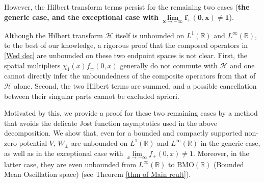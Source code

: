 \documentclass[reqno]{amsart}
\newcommand\R{\mathbb{R}}
\newcommand\HH{\mathcal{H}}
\numberwithin{equation}{section}
\begin{document}
However, the Hilbert transform terms persist for the remaining two cases ({\bf the generic case, and the exceptional case with} $\bm{\lim\limits_{x\rightarrow-\infty}f_+(0,x)\neq1}$).

Although the Hilbert transform $\HH$ itself is unbounded on $L^1(\R)$ and $L^{\infty}(\R)$, to the best of our knowledge, a rigorous proof that the composed operators in \eqref{Wed dec}
are unbounded on these two endpoint spaces is not clear. 
First, the spatial multipliers $\chi_{1}(x)f_{\pm}(0,x)$ generally do not commute with
$\mathcal{H}$ and one cannot directly infer the unboundedness
of the composite operators from that of $\mathcal{H}$ alone. Second, the two Hilbert terms are summed, and a possible cancellation between
their singular parts cannot be excluded apriori. 


Motivated by this, we provide a proof for these two remaining cases by a method that avoids the delicate Jost function asymptotics used in the above decomposition. We show that, even for a bounded and compactly supported non-zero potential $V$, $W_{\pm}$ are unbounded on $L^1(\R)$ and $L^{\infty}(\R)$ in the generic case, 
as well as in the exceptional case with 
$\lim\limits_{x\rightarrow-\infty}f_+(0,x)\neq1$. Moreover, in the latter case, 
they are even unbounded from $L^{\infty}(\R)$ to $\mathrm{BMO}(\R)$ (Bounded Mean Oscillation space)  (see Theorem \ref{thm of Main reult}).
\end{document}
